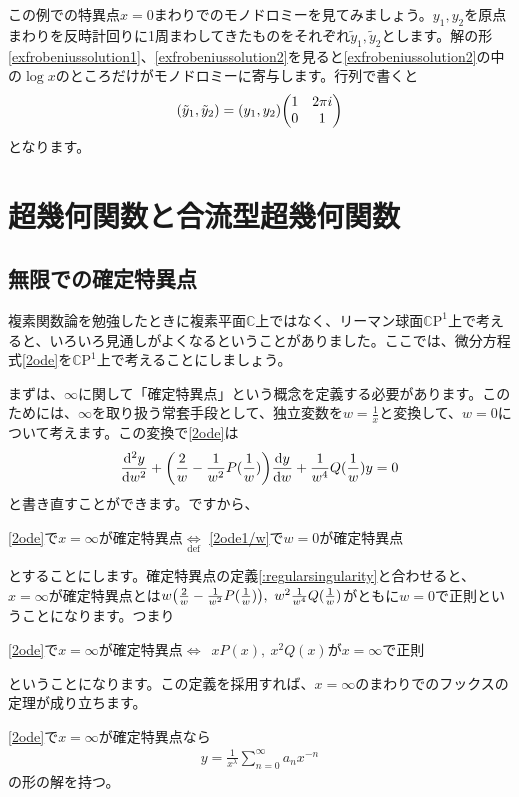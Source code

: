 \documentclass[report,paper=a4, fontsize=12pt, line_length=16cm, number_of_lines=33,dvipdfmx]{jlreq}
\newenvironment{important}{\begin{tcolorbox}[
  colback = white,
  colframe = red!35,
  boxrule = 2mm,
  fonttitle = \bfseries,
  after = \noindent] }{\end{tcolorbox}}
\numberwithin{equation}{section}
\newcommand{\Cb}{\mathbb{C}}
\newcommand{\CP}{\Cb \mathrm{P}}
\newcommand{\yt}{\tilde{y}}
\begin{document}
この例での特異点$x=0$まわりでのモノドロミーを見てみましょう。$y_1,y_2$を原点まわりを反時計回りに1周まわしてきたものをそれぞれ$\yt_1,\yt_2$とします。解の形\eqref{exfrobeniussolution1}、\eqref{exfrobeniussolution2}を見ると\eqref{exfrobeniussolution2}の中の$\log x$のところだけがモノドロミーに寄与します。行列で書くと
\begin{align}
  (\yt_1,\yt_2)=
  (y_1,y_2)\mqty(1&2\pi i\\
  0 & 1)
\end{align}
となります。

\section{超幾何関数と合流型超幾何関数}
\subsection{無限での確定特異点}
複素関数論を勉強したときに複素平面$\Cb$上ではなく、リーマン球面$\CP^1$上で考えると、いろいろ見通しがよくなるということがありました。ここでは、微分方程式\eqref{2ode}を$\CP^1$上で考えることにしましょう。

まずは、$\infty$に関して「確定特異点」という概念を定義する必要があります。このためには、$\infty$を取り扱う常套手段として、独立変数を$w=\frac{1}{x}$と変換して、$w=0$について考えます。この変換で\eqref{2ode}は
\begin{align}
  \dv[2]{y}{w}+\qty(\frac{2}{w}-\frac{1}{w^2}P(\frac{1}{w}))\dv{y}{w}+\frac{1}{w^4}Q(\frac{1}{w})y=0\label{2ode1/w}
\end{align}
と書き直すことができます。ですから、
\begin{definition}{}{}
  \eqref{2ode}で$x=\infty$が確定特異点$\underset{\text{def}}{\Leftrightarrow}$
  \eqref{2ode1/w}で$w=0$が確定特異点
\end{definition}
とすることにします。確定特異点の定義\ref{:regularsingularity}と合わせると、$x=\infty$が確定特異点とは$w\qty(\frac{2}{w}-\frac{1}{w^2}P(\frac{1}{w})),\ w^2\frac{1}{w^4}Q(\frac{1}{w})$がともに$w=0$で正則ということになります。つまり
\begin{important}
  \eqref{2ode}で$x=\infty$が確定特異点$\Leftrightarrow$\ $xP(x),\ x^2 Q(x)$が$x=\infty$で正則
\end{important}
ということになります。この定義を採用すれば、$x=\infty$のまわりでのフックスの定理が成り立ちます。
\begin{theor}{}{}
  \eqref{2ode}で$x=\infty$が確定特異点なら
  \begin{align}
    y=\frac{1}{x^{\lambda}}\sum_{n=0}^{\infty} a_nx^{-n}
  \end{align}
  の形の解を持つ。
\end{theor}
\end{document}

